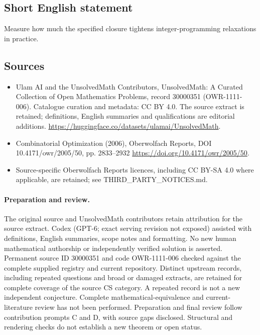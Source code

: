 \documentclass[11pt]{article}
\begin{document}
\subsection{Short English statement}
Measure how much the specified closure tightens integer-programming relaxations in practice.
\subsection{Sources}
\begin{itemize}
\item[\hypertarget{source:30000351:1}{S1}] Ulam AI and the UnsolvedMath Contributors, UnsolvedMath: A Curated Collection of Open Mathematics Problems, record 30000351 (OWR-1111-006). Catalogue curation and metadata: CC BY 4.0. The source extract is retained; definitions, English summaries and qualifications are editorial additions.
\url{https://huggingface.co/datasets/ulamai/UnsolvedMath}.
\item[\hypertarget{source:30000351:2}{S2}] Combinatorial Optimization (2006), Oberwolfach Reports, DOI 10.4171/owr/2005/50, pp. 2833--2932
\url{https://doi.org/10.4171/owr/2005/50}.
\item Source-specific Oberwolfach Reports licences, including CC BY-SA 4.0 where applicable, are retained; see THIRD\_PARTY\_NOTICES.md.
\end{itemize}
\paragraph{Preparation and review.}
The original source and UnsolvedMath contributors retain attribution for the source extract. Codex (GPT-6; exact serving revision not exposed) assisted with definitions, English summaries, scope notes and formatting. No new human mathematical authorship or independently verified solution is asserted. Permanent source ID 30000351 and code OWR-1111-006 checked against the complete supplied registry and current repository. Distinct upstream records, including repeated questions and broad or damaged extracts, are retained for complete coverage of the source CS category. A repeated record is not a new independent conjecture. Complete mathematical-equivalence and current-literature review has not been performed. Preparation and final review follow contribution prompts C and D, with source gaps disclosed. Structural and rendering checks do not establish a new theorem or open status.
\label{end:30000351}
\end{document}
